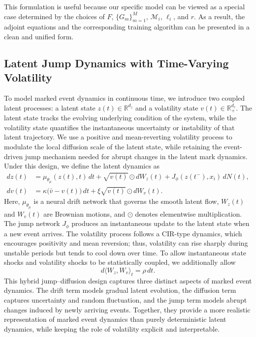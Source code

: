 \documentclass[11pt]{article}
\theoremstyle{definition}
\numberwithin{equation}{section}
\numberwithin{theorem}{section}
\numberwithin{proposition}{section}
\numberwithin{lemma}{section}
\numberwithin{corollary}{section}
\numberwithin{definition}{section}
\numberwithin{remark}{section}
\newcommand{\1}{\mathbbm{1}}
\begin{document}
This formulation is useful because our specific model can be viewed as a special case determined by the choices of $F$, $\{G_m\}_{m=1}^M$, $\mathcal{M}_i$, $\ell_i$, and $r$. As a result, the adjoint equations and the corresponding training algorithm can be presented in a clean and unified form.


\subsection{Latent Jump Dynamics with Time-Varying Volatility}

To model marked event dynamics in continuous time, we introduce two coupled latent processes: a latent state $z(t) \in \mathbb{R}^{d_z}$ and a volatility state $v(t) \in \mathbb{R}_{+}^{d_z}$. 
The latent state tracks the evolving underlying condition of the system, while the volatility state quantifies the instantaneous uncertainty or instability of that latent trajectory. 
We use a positive and mean-reverting volatility process to modulate the local diffusion scale of the latent state, while retaining the event-driven jump mechanism needed for abrupt changes in the latent mark dynamics. 
Under this design, we define the latent dynamics as
\begin{equation}
\label{eq:svnsde_dynamics}
\begin{aligned}
dz(t) &= \mu_{\theta_\mu}(z(t), t)\,dt
      + \sqrt{v(t)} \odot dW_z(t)
      + J_{\phi}(z(t^-), x_i)\,dN(t), \\
dv(t) &= \kappa\bigl(\bar v - v(t)\bigr)\,dt
      + \xi \sqrt{v(t)} \odot dW_v(t).
\end{aligned}
\end{equation}
Here, $\mu_{\theta_\mu}$ is a neural drift network that governs the smooth latent flow, $W_z(t)$ and $W_v(t)$ are Brownian motions, and $\odot$ denotes elementwise multiplication. 
The jump network $J_{\phi}$ produces an instantaneous update to the latent state when a new event arrives. 
The volatility process follows a CIR-type dynamics, which encourages positivity and mean reversion; thus, volatility can rise sharply during unstable periods but tends to cool down over time. 
To allow instantaneous state shocks and volatility shocks to be statistically coupled, we additionally allow
\begin{equation}
\label{eq:brownian_correlation}
d\langle W_z, W_v \rangle_t = \rho\,dt.
\end{equation}
This hybrid jump--diffusion design captures three distinct aspects of marked event dynamics. 
The drift term models gradual latent evolution, the diffusion term captures uncertainty and random fluctuation, and the jump term models abrupt changes induced by newly arriving events. 
Together, they provide a more realistic representation of marked event dynamics than purely deterministic latent dynamics, while keeping the role of volatility explicit and interpretable.
\end{document}
